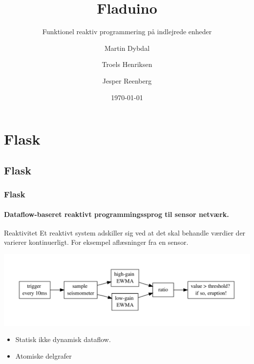 \documentclass{beamer}
\title{Fladuino}
\subtitle{Funktionel reaktiv programmering på indlejrede enheder}
\author{Martin Dybdal \and Troels Henriksen \and Jesper Reenberg}
\institute{\textrm{Datalogisk Institut, Københavns Universitet}}
\date{\today}
\begin{document}
\frame{\titlepage}


\section{Flask}
\subsection{Flask}
\begin{frame}[t]
  \frametitle{Flask} 
  \framesubtitle{Dataflow-baseret reaktivt programmingssprog
    til sensor netværk.}

  \begin{block}{Reaktivitet}
    Et reaktivt system adskiller sig ved at det skal behandle værdier
    der varierer kontinuerligt. For eksempel aflæsninger fra en
    sensor.
  \end{block}

  \pause
  \includegraphics[width=\textwidth]{flask-ewma}

  \pause

  \begin{itemize}
  \item Statisk ikke dynamisk dataflow.
  \item Atomiske delgrafer
  \end{itemize}

 
\end{frame}
\end{document}
